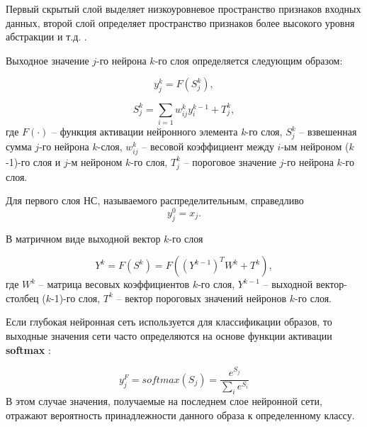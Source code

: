 Первый скрытый слой выделяет низкоуровневое пространство признаков входных данных, второй слой определяет пространство признаков более высокого уровня абстракции и т.д. \cite{n3}. 

Выходное значение $j$-го нейрона $k$-го слоя определяется следующим образом:

\begin{equation}
y_j^k=F(S_j^k),
\end{equation}

\begin{equation}
S_j^k=\sum_{i=1} w_{ij}^ky_i^{k-1}+T_j^k,
\end{equation}
где $F(\cdot)$ -- функция активации нейронного элемента \textit{k}-го слоя, $S_j^k$ -- взвешенная сумма $j$-го нейрона $k$-слоя, $w_{ij}^k$ -- весовой коэффициент между $i$-ым нейроном ($k$-1)-го слоя и $j$-м нейроном $k$-го слоя, $T_j^k$ -- пороговое значение $j$-го нейрона $k$-го слоя.

Для первого слоя НС, называемого распределительным, справедливо		
\begin{equation}
y_j^0=x_j.
\end{equation}

В матричном виде выходной вектор $k$-го слоя 

\begin{equation}
Y^k=F(S^k)=F((Y^{k-1})^TW^k+T^k),
\end{equation}
где $W^k$ -- матрица весовых коэффициентов $k$-го слоя, $Y^{k-1}$ -- выходной вектор-столбец ($k$-1)-го слоя, $T^k$ -- вектор пороговых значений нейронов $k$-го слоя.

Если глубокая нейронная сеть используется для классификации образов, то выходные значения сети часто определяются на основе функции активации \textbf{softmax} \cite{golovko2017}: 		

\begin{equation}
y_j^F=softmax(S_j)=\frac{e^{S_j}}{\sum_i e^{S_i}}
\end{equation}
В этом случае значения, получаемые на последнем слое нейронной сети, отражают вероятность принадлежности данного образа к определенному классу.

